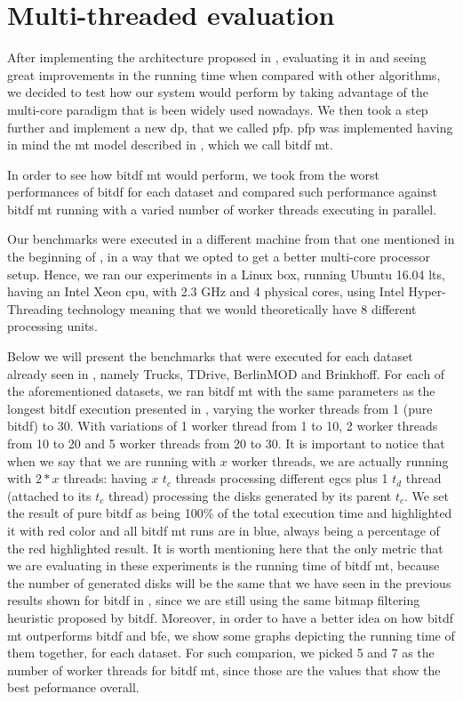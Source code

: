 {%
\section{Multi-threaded evaluation}
After implementing the architecture proposed in , evaluating it in  and
seeing great improvements in the running time when compared with other algorithms, we decided to test how our system
would perform by taking advantage of the multi-core paradigm that is been widely used nowadays. We then took a step
further and implement a new \ac{dp}, that we called \ac{pfp}. \ac{pfp} was implemented having in mind the \ac{mt} model
described in , which we call \ac{bitdf} \ac{mt}.

In order to see how \ac{bitdf} \ac{mt} would perform, we took from  the worst performances of
\ac{bitdf} for each dataset and compared such performance against \ac{bitdf} \ac{mt} running with a varied number of
worker threads executing in parallel.

Our benchmarks were executed in a different machine from that one mentioned in the beginning of ,
in a way that we opted to get a better multi-core processor setup. Hence, we ran our experiments in a Linux box, running
Ubuntu 16.04 \ac{lts}, having an Intel Xeon \ac{cpu}, with 2.3 GHz and 4 physical cores, using Intel Hyper-Threading
technology \cite{hyper} meaning that we would theoretically have 8 different processing units.

Below we will present the benchmarks that were executed for each dataset already seen in , namely
Trucks, TDrive, BerlinMOD and Brinkhoff. For each of the aforementioned datasets, we ran \ac{bitdf} \ac{mt} with the
same parameters as the longest \ac{bitdf} execution presented in , varying the worker threads from
1 (pure \ac{bitdf}) to 30. With variations of 1 worker thread from 1 to 10, 2 worker threads from 10 to 20 and 5 worker
threads from 20 to 30. It is important to notice that when we say that we are running with $x$ worker threads, we are
actually running with $2*x$ threads: having $x$ $t_c$ threads processing different \acp{egc} plus 1 $t_d$ thread
(attached to its $t_c$ thread) processing the disks generated by its parent $t_c$. We set the result of pure \ac{bitdf}
as being 100\% of the total execution time and highlighted it with red color and all \ac{bitdf} \ac{mt} runs are in
blue, always being a percentage of the red highlighted result. It is worth mentioning here that the only metric that we
are evaluating in these experiments is the running time of \ac{bitdf} \ac{mt}, because the number of generated disks
will be the same that we have seen in the previous results shown for \ac{bitdf} in , since we are
still using the same bitmap filtering heuristic proposed by \ac{bitdf}. Moreover, in order to have a better idea on how
\ac{bitdf} \ac{mt} outperforms \ac{bitdf} and \ac{bfe}, we show some graphs depicting the running time of them together,
for each dataset. For such comparion, we picked 5 and 7 as the number of worker threads for \ac{bitdf} \ac{mt}, since
those are the values that show the best peformance overall.

}
